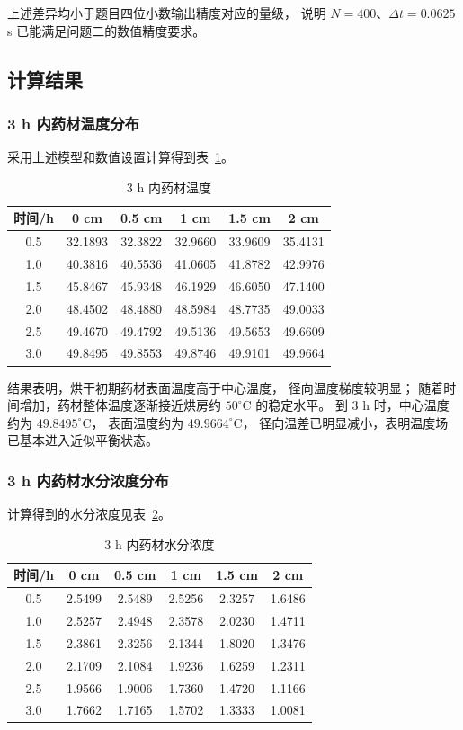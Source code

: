 \documentclass[UTF8,a4paper,12pt]{ctexart}
\begin{document}
上述差异均小于题目四位小数输出精度对应的量级，
说明 $N=400$、$\Delta t=0.0625$ s 已能满足问题二的数值精度要求。

\subsection{计算结果}

\subsubsection{3 h 内药材温度分布}

采用上述模型和数值设置计算得到表~\ref{tab:q2T}。

\begin{table}[H]
\centering
\caption{3 h 内药材温度}
\label{tab:q2T}
\begin{tabular}{cccccc}
\toprule
时间/h & 0 cm & 0.5 cm & 1 cm & 1.5 cm & 2 cm\\
\midrule
0.5 & 32.1893 & 32.3822 & 32.9660 & 33.9609 & 35.4131\\
1.0 & 40.3816 & 40.5536 & 41.0605 & 41.8782 & 42.9976\\
1.5 & 45.8467 & 45.9348 & 46.1929 & 46.6050 & 47.1400\\
2.0 & 48.4502 & 48.4880 & 48.5984 & 48.7735 & 49.0033\\
2.5 & 49.4670 & 49.4792 & 49.5136 & 49.5653 & 49.6609\\
3.0 & 49.8495 & 49.8553 & 49.8746 & 49.9101 & 49.9664\\
\bottomrule
\end{tabular}
\end{table}

结果表明，烘干初期药材表面温度高于中心温度，
径向温度梯度较明显；
随着时间增加，药材整体温度逐渐接近烘房约 $50^\circ\mathrm{C}$ 的稳定水平。
到 3 h 时，中心温度约为 $49.8495^\circ\mathrm{C}$，
表面温度约为 $49.9664^\circ\mathrm{C}$，
径向温差已明显减小，表明温度场已基本进入近似平衡状态。

\subsubsection{3 h 内药材水分浓度分布}

计算得到的水分浓度见表~\ref{tab:q2C}。

\begin{table}[H]
\centering
\caption{3 h 内药材水分浓度}
\label{tab:q2C}
\begin{tabular}{cccccc}
\toprule
时间/h & 0 cm & 0.5 cm & 1 cm & 1.5 cm & 2 cm\\
\midrule
0.5 & 2.5499 & 2.5489 & 2.5256 & 2.3257 & 1.6486\\
1.0 & 2.5257 & 2.4948 & 2.3578 & 2.0230 & 1.4711\\
1.5 & 2.3861 & 2.3256 & 2.1344 & 1.8020 & 1.3476\\
2.0 & 2.1709 & 2.1084 & 1.9236 & 1.6259 & 1.2311\\
2.5 & 1.9566 & 1.9006 & 1.7360 & 1.4720 & 1.1166\\
3.0 & 1.7662 & 1.7165 & 1.5702 & 1.3333 & 1.0081\\
\bottomrule
\end{tabular}
\end{table}
\end{document}

